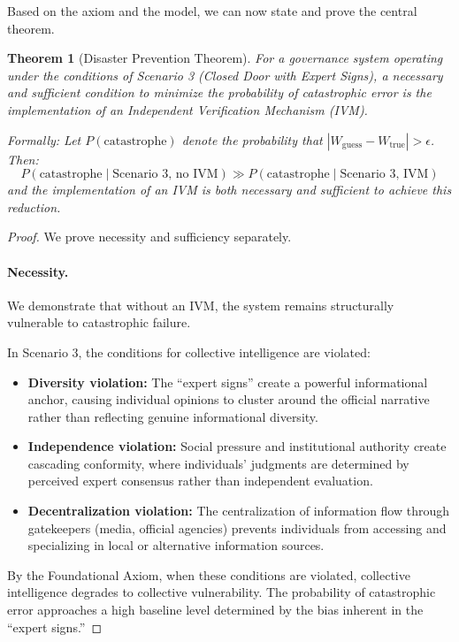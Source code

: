 \documentclass[11pt,a4paper]{article}
\newtheorem{theorem}{Theorem}[section]
\begin{document}
\begin{small}
Based on the axiom and the model, we can now state and prove the central theorem.

\begin{theorem}[Disaster Prevention Theorem]
For a governance system operating under the conditions of Scenario 3 (Closed Door with Expert Signs), a necessary and sufficient condition to minimize the probability of catastrophic error is the implementation of an Independent Verification Mechanism (IVM).

Formally: Let $P(\text{catastrophe})$ denote the probability that $|W_{\text{guess}} - W_{\text{true}}| > \epsilon$. Then:
\begin{equation}
P(\text{catastrophe} \mid \text{Scenario 3, no IVM}) \gg P(\text{catastrophe} \mid \text{Scenario 3, IVM})
\end{equation}
and the implementation of an IVM is both necessary and sufficient to achieve this reduction.
\end{theorem}

\begin{proof}
We prove necessity and sufficiency separately.

\paragraph{Necessity.} We demonstrate that without an IVM, the system remains structurally vulnerable to catastrophic failure.

In Scenario 3, the conditions for collective intelligence are violated:
\begin{itemize}
    \item \textbf{Diversity violation:} The ``expert signs'' create a powerful informational anchor, causing individual opinions to cluster around the official narrative rather than reflecting genuine informational diversity.
    \item \textbf{Independence violation:} Social pressure and institutional authority create cascading conformity, where individuals' judgments are determined by perceived expert consensus rather than independent evaluation.
    \item \textbf{Decentralization violation:} The centralization of information flow through gatekeepers (media, official agencies) prevents individuals from accessing and specializing in local or alternative information sources.
\end{itemize}

By the Foundational Axiom, when these conditions are violated, collective intelligence degrades to collective vulnerability. The probability of catastrophic error approaches a high baseline level determined by the bias inherent in the ``expert signs.''


\end{proof}
\end{small}
\end{document}
